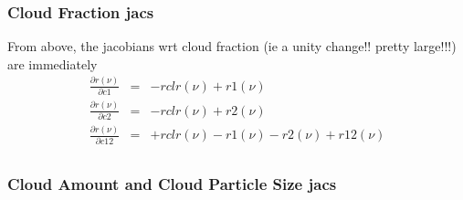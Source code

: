 \documentclass[11pt]{article}
\begin{document}
\subsubsection{Cloud Fraction jacs}
From above, the jacobians wrt cloud fraction (ie a unity change!! pretty large!!!) are immediately
\[
\begin{array}{ccc}
\frac{\partial r(\nu)}{\partial c1} & = & -rclr(\nu) + r1(\nu) \\
\frac{\partial r(\nu)}{\partial c2} & = & -rclr(\nu) + r2(\nu) \\
\frac{\partial r(\nu)}{\partial c12} & = & +rclr(\nu) - r1(\nu) - r2(\nu) + r12(\nu) \\
\end{array}
\]

\subsubsection{Cloud Amount and Cloud Particle Size jacs}
\end{document}
